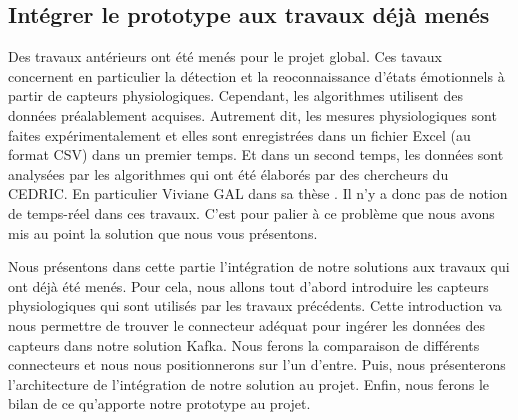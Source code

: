 \documentclass{article}
\begin{document}
	\subsection{Intégrer le prototype aux travaux déjà menés}\label{sec:travaux}
		Des travaux antérieurs ont été menés pour le projet global.
		Ces tavaux concernent en particulier la détection et la reoconnaissance d'états émotionnels à partir de capteurs physiologiques.
		Cependant, les algorithmes utilisent des données préalablement acquises. 
		Autrement dit, les mesures physiologiques sont faites expérimentalement et elles sont enregistrées dans un fichier Excel (au format CSV) dans un premier temps.
		Et dans un second temps, les données sont analysées par les algorithmes qui ont été élaborés par des chercheurs du CEDRIC.
		En particulier Viviane GAL dans sa thèse \cite{gal_2019}.
		Il n'y a donc pas de notion de temps-réel dans ces travaux.
		C'est pour palier à ce problème que nous avons mis au point la solution que nous vous présentons.\par
		Nous présentons dans cette partie l'intégration de notre solutions aux travaux qui ont déjà été menés.
		Pour cela, nous allons tout d'abord introduire les capteurs physiologiques qui sont utilisés par les travaux précédents.
		Cette introduction va nous permettre de trouver le connecteur adéquat pour ingérer les données des capteurs dans notre solution Kafka.
		Nous ferons la comparaison de différents connecteurs et nous nous positionnerons sur l'un d'entre.
		Puis, nous présenterons l'architecture de l'intégration de notre solution au projet.
		Enfin, nous ferons le bilan de ce qu'apporte notre prototype au projet.
\end{document}
